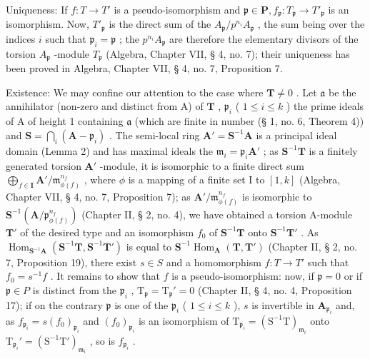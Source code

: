 Uniqueness: If \(f\colon T\to T'\) is a pseudo-isomorphism and \(\mathfrak{p}\in\mathbf{P},f_{\mathfrak{p}}\colon T_{\mathfrak{p}}\to T'_{\mathfrak{p}}\) is an isomorphism. Now, \(T'_{\mathfrak{p}}\) is the direct sum of the \(A_{\mathfrak{p}}/p^{n_{i}}A_{\mathfrak{p}}\) , the sum being over the indices \(i\) such that \(\mathfrak{p}_{i}=\mathfrak{p}\) ; the \(p^{n_{i}}A_{\mathfrak{p}}\) are therefore the elementary divisors of the torsion \(A_{\mathfrak{p}}\) -module \(T_{\mathfrak{p}}\) (Algebra, Chapter VII, § 4, no. 7); their uniqueness has been proved in Algebra, Chapter VII, § 4, no. 7, Proposition 7.

Existence: We may confine our attention to the case where \(\mathbf{T} \neq 0\) . Let \(\mathfrak{a}\) be the annihilator (non-zero and distinct from A) of \(\mathbf{T}\) , \(\mathfrak{p}_i\) ( \(1 \leqslant i \leqslant k\) ) the prime ideals of A of height 1 containing \(\mathfrak{a}\) (which are finite in number (§ 1, no. 6, Theorem 4)) and \(\mathbf{S} = \bigcap_i (\mathbf{A} - \mathfrak{p}_i)\) . The semi-local ring \(\mathbf{A}' = \mathbf{S}^{-1}\mathbf{A}\) is a principal ideal domain (Lemma 2) and has maximal ideals the \(\mathfrak{m}_i = \mathfrak{p}_i\mathbf{A}'\) ; as \(\mathbf{S}^{-1}\mathbf{T}\) is a finitely generated torsion \(\mathbf{A}'\) -module, it is isomorphic to a finite direct sum \(\bigoplus_{f \in \mathbf{I}} \mathbf{A}' / \mathfrak{m}_{\phi(f)}^{n_f}\) , where \(\phi\) is a mapping of a finite set I to \([1, k]\) (Algebra, Chapter VII, § 4, no. 7, Proposition 7); as \(\mathbf{A}' / \mathfrak{m}_{\phi(f)}^{n_f}\) is isomorphic to \(\mathbf{S}^{-1}(\mathbf{A} / \mathfrak{p}_{\phi(f)}^{n_f})\) (Chapter II, § 2, no. 4), we have obtained a torsion A-module \(\mathbf{T}'\) of the desired type and an isomorphism \(f_0\) of \(\mathbf{S}^{-1}\mathbf{T}\) onto \(\mathbf{S}^{-1}\mathbf{T}'\) . As \(\operatorname{Hom}_{\mathbf{S}^{-1}\mathbf{A}}(\mathbf{S}^{-1}\mathbf{T}, \mathbf{S}^{-1}\mathbf{T}')\) is equal to \(\mathbf{S}^{-1}\operatorname{Hom}_{\mathbf{A}}(\mathbf{T}, \mathbf{T}')\) (Chapter II, § 2, no. 7, Proposition 19), there exist \(s \in S\) and a homomorphism \(f: T \to T'\) such that \(f_0 = s^{-1}f\) . It remains to show that \(f\) is a pseudo-isomorphism: now, if \(\mathfrak{p} = 0\) or if \(\mathfrak{p} \in P\) is distinct from the \(\mathfrak{p}_i\) , \(\mathrm{T}_{\mathfrak{p}} = \mathrm{T}_{\mathfrak{p}}' = 0\) (Chapter II, § 4, no. 4, Proposition 17); if on the contrary \(\mathfrak{p}\) is one of the \(\mathfrak{p}_i\) ( \(1 \leqslant i \leqslant k\) ), \(s\) is invertible in \(\mathbf{A}_{\mathfrak{p}_i}\) and, as \(f_{\mathfrak{p}_i} = s(f_0)_{\mathfrak{p}_i}\) and \((f_0)_{\mathfrak{p}_i}\) is an isomorphism of \(\mathrm{T}_{\mathfrak{p}_i} = (\mathrm{S}^{-1}\mathrm{T})_{\mathfrak{m}_i}\) onto \(\mathrm{T}_{\mathfrak{p}_i}' = (\mathrm{S}^{-1}\mathrm{T}')_{\mathfrak{m}_i}\) , so is \(f_{\mathfrak{p}_i}\) .

